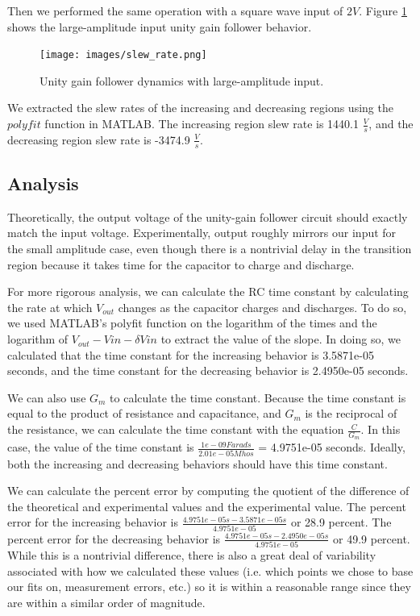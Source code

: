 \documentclass{article}
\begin{document}
Then we performed the same operation with a square wave input of $2V$. Figure \ref{fig:slew_rate} shows the large-amplitude input unity gain follower behavior.

\begin{figure}[H]
  \begin{center}      
  \texttt{[image: images/slew\_rate.png]}
  \caption{Unity gain follower dynamics with large-amplitude input.}   
  \label{fig:slew_rate}
  \end{center}
\end{figure}

We extracted the slew rates of the increasing and decreasing regions using the $polyfit$ function in MATLAB. The increasing region slew rate is 1440.1 $\frac{V}{s}$, and the decreasing region slew rate is -3474.9 $\frac{V}{s}$. 

\subsection{Analysis}
Theoretically, the output voltage of the unity-gain follower circuit should exactly match the input voltage. Experimentally, output roughly mirrors our input for the small amplitude case, even though there is a nontrivial delay in the transition region because it takes time for the capacitor to charge and discharge. 

For more rigorous analysis, we can calculate the RC time constant by calculating the rate at which $V_{out}$ changes as the capacitor charges and discharges. To do so, we used MATLAB's polyfit function on the logarithm of the times and the logarithm of $V_{out} - V{in} - \delta V{in}$ to extract the value of the slope. In doing so, we calculated that the time constant for the increasing behavior is 3.5871e-05 seconds, and the time constant for the decreasing behavior is 2.4950e-05 seconds.

We can also use $G_m$ to calculate the time constant. Because the time constant is equal to the product of resistance and capacitance, and $G_m$ is the reciprocal of the resistance, we can calculate the time constant with the equation $\frac{C}{G_m}$. In this case, the value of the time constant is $\frac{1e-09 Farads}{2.01e-05 Mhos}$ = 4.9751e-05 seconds. Ideally, both the increasing and decreasing behaviors should have this time constant. 

We can calculate the percent error by computing the quotient of the difference of the theoretical and experimental values and the experimental value. The percent error for the increasing behavior is $\frac{4.9751e-05 s - 3.5871e-05 s}{4.9751e-05}$ or 28.9 percent. The percent error for the decreasing behavior is $\frac{4.9751e-05 s - 2.4950e-05 s}{4.9751e-05}$ or 49.9 percent. While this is a nontrivial difference, there is also a great deal of variability associated with how we calculated these values (i.e. which points we chose to base our fits on, measurement errors, etc.) so it is within a reasonable range since they are within a similar order of magnitude. 
\end{document}
